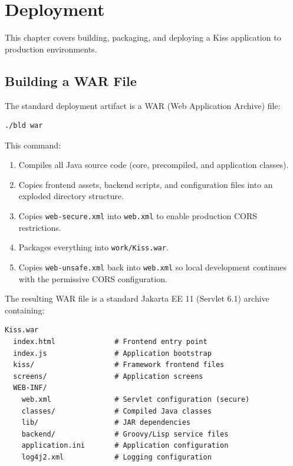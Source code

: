 \chapter{Deployment}
\label{ch:deployment}

This chapter covers building, packaging, and deploying a Kiss application to production environments.

\section{Building a WAR File}
\label{sec:deploy-war}

The standard deployment artifact is a WAR (Web Application Archive) file:

\begin{lstlisting}[style=shell]
./bld war
\end{lstlisting}

\noindent
This command:

\begin{enumerate}
  \item Compiles all Java source code (core, precompiled, and application classes).
  \item Copies frontend assets, backend scripts, and configuration files into an exploded directory structure.
  \item Copies \texttt{web-secure.xml} into \texttt{web.xml} to enable production CORS restrictions.
  \item Packages everything into \texttt{work/Kiss.war}.
  \item Copies \texttt{web-unsafe.xml} back into \texttt{web.xml} so local development continues with the permissive CORS configuration.
\end{enumerate}

\noindent
The resulting WAR file is a standard Jakarta EE 11 (Servlet 6.1) archive containing:

\begin{lstlisting}[style=ini]
Kiss.war
  index.html              # Frontend entry point
  index.js                # Application bootstrap
  kiss/                   # Framework frontend files
  screens/                # Application screens
  WEB-INF/
    web.xml               # Servlet configuration (secure)
    classes/              # Compiled Java classes
    lib/                  # JAR dependencies
    backend/              # Groovy/Lisp service files
    application.ini       # Application configuration
    log4j2.xml            # Logging configuration
\end{lstlisting}

